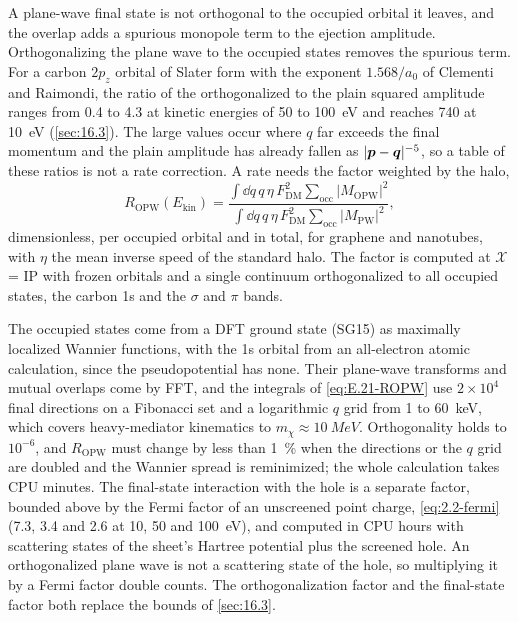 A plane-wave final state is not orthogonal to the occupied orbital it leaves, and the overlap adds a spurious monopole term to the ejection amplitude. Orthogonalizing the plane wave to the occupied states removes the spurious term. For a carbon $2p_z$ orbital of Slater form with the exponent $1.568/a_0$ of Clementi and Raimondi, the ratio of the orthogonalized to the plain squared amplitude ranges from 0.4 to 4.3 at kinetic energies of 50 to \SI{100}{eV} and reaches 740 at \SI{10}{eV} (\cref{sec:16.3}). The large values occur where $q$ far exceeds the final momentum and the plain amplitude has already fallen as $|\bm{p} - \bm{q}|^{-5}$, so a table of these ratios is not a rate correction. A rate needs the factor weighted by the halo,
\begin{equation}
  R_{\mathrm{OPW}}(E_{\mathrm{kin}}) = \frac{\int\dd q\,q\,\eta\,F_{\mathrm{DM}}^2\sum_{\mathrm{occ}}|M_{\mathrm{OPW}}|^2}{\int\dd q\,q\,\eta\,F_{\mathrm{DM}}^2\sum_{\mathrm{occ}}|M_{\mathrm{PW}}|^2} ,
  \label{eq:E.21-ROPW}
\end{equation}
dimensionless, per occupied orbital and in total, for graphene and nanotubes, with $\eta$ the mean inverse speed of the standard halo. The factor is computed at $\mathcal{X}$ = IP with frozen orbitals and a single continuum orthogonalized to all occupied states, the carbon 1s and the $\sigma$ and $\pi$ bands.

The occupied states come from a DFT ground state (SG15) as maximally localized Wannier functions, with the 1s orbital from an all-electron atomic calculation, since the pseudopotential has none. Their plane-wave transforms and mutual overlaps come by FFT, and the integrals of \cref{eq:E.21-ROPW} use $2\times10^4$ final directions on a Fibonacci set and a logarithmic $q$ grid from 1 to \SI{60}{keV}, which covers heavy-mediator kinematics to $m_\chi \approx \SI{10}{MeV}$. Orthogonality holds to $10^{-6}$, and $R_{\mathrm{OPW}}$ must change by less than \SI{1}{\percent} when the directions or the $q$ grid are doubled and the Wannier spread is reminimized; the whole calculation takes CPU minutes. The final-state interaction with the hole is a separate factor, bounded above by the Fermi factor of an unscreened point charge, \cref{eq:2.2-fermi} (7.3, 3.4 and 2.6 at 10, 50 and \SI{100}{eV}), and computed in CPU hours with scattering states of the sheet's Hartree potential plus the screened hole. An orthogonalized plane wave is not a scattering state of the hole, so multiplying it by a Fermi factor double counts. The orthogonalization factor and the final-state factor both replace the bounds of \cref{sec:16.3}.

